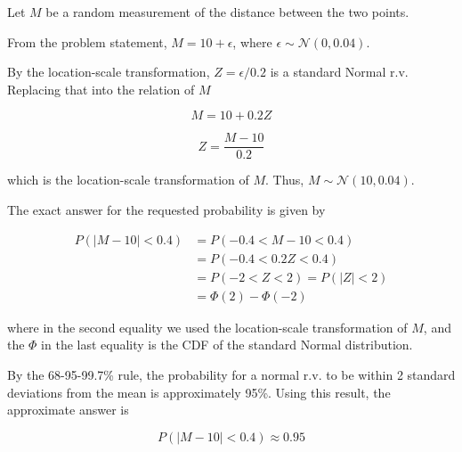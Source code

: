 Let $M$ be a random measurement of the distance between the two points.

From the problem statement, $M = 10 + \epsilon$, where $\epsilon \sim \mathcal{N}(0, 0.04)$.

By the location-scale transformation, $Z = \epsilon/0.2$ is a standard Normal r.v.
Replacing that into the relation of $M$

$$
M = 10 + 0.2 Z
$$

$$
Z = \frac{M-10}{0.2}
$$

\noindent which is the location-scale transformation of $M$. Thus, $M \sim \mathcal{N}(10, 0.04)$.

The exact answer for the requested probability is given by

\begin{equation*}
\begin{split}
P( |M-10| < 0.4 )
&= P(-0.4 < M-10 < 0.4) \\
&= P(-0.4 < 0.2Z < 0.4) \\
&= P(-2 < Z < 2) = P(|Z| < 2) \\
&= \Phi(2) - \Phi(-2)
\end{split}
\end{equation*}

\noindent
where in the second equality we used the location-scale transformation of $M$, and the $\Phi$ in the last equality is the CDF of the standard Normal distribution.

By the 68-95-99.7\% rule, the probability for a normal r.v. to be within 2 standard deviations from the mean is approximately 95\%. Using this result, the approximate answer is

$$
P( |M-10| < 0.4 ) \approx 0.95
$$

